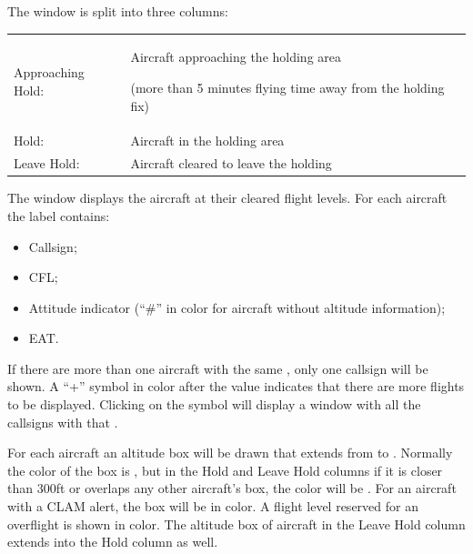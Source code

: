 \documentclass[a4paper,oneside,11pt]{memoir}
\begin{document}
\bigskip

The window is split into three columns:

\bigskip

\begin{longtable}{p{2.5cm} p{10cm}}
    Approaching Hold:   & Aircraft approaching the holding area
    
                          (more than 5 minutes flying time away from the holding fix)\\
    Hold:               & Aircraft in the holding area\\
    Leave Hold:         & Aircraft cleared to leave the holding\\   
\end{longtable}

\bigskip

The window displays the aircraft at their cleared flight levels. For each aircraft the label contains:

\begin{itemize}
  \item Callsign;
  \item CFL;
  \item Attitude indicator (“\#” in  color for aircraft without altitude information);
  \item EAT.
\end{itemize}

If there are more than one aircraft with the same , only one callsign will be shown. A “+” symbol in  color after the  value indicates that there are more flights to be displayed. Clicking on the symbol will display a window with all the callsigns with that .

\bigskip

For each aircraft an altitude box will be drawn that extends from  to . Normally the color of the box is , but in the Hold and Leave Hold columns if it is closer than 300ft or overlaps any other aircraft’s box, the color will be . For an aircraft with a CLAM alert, the box will be in  color. A flight level reserved for an overflight is shown in  color. The altitude box of aircraft in the Leave Hold column extends into the Hold column as well.

\end{document}
